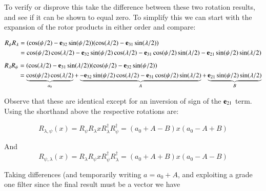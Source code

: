 \documentclass{article}      %
\begin{document}
To verify or disprove this take the difference between these two rotation results, and see if it can be shown to equal zero.  To simplify this we can start with the expansion of the rotor products in either order and compare:

\begin{align*}
R_{\psi} R_{\lambda} 
&= ( \cos(\psi/2) - \mathbf{e}_{32}\sin(\psi/2) )(\cos(\lambda/2) - \mathbf{e}_{31}\sin(\lambda/2)) \\
&= \cos(\psi/2)\cos(\lambda/2) - \mathbf{e}_{32}\sin(\psi/2)\cos(\lambda/2) - \mathbf{e}_{31} \cos(\psi/2) \sin(\lambda/2) - \mathbf{e}_{21} \sin(\psi/2) \sin(\lambda/2) \\
\end{align*}
\begin{align*}
R_{\lambda} R_{\psi}
&= (\cos(\lambda/2) - \mathbf{e}_{31}\sin(\lambda/2)) ( \cos(\psi/2) - \mathbf{e}_{32}\sin(\psi/2) ) \\
&= \underbrace{\cos(\psi/2)\cos(\lambda/2)}_{a_0} + \underbrace{-\mathbf{e}_{32}\sin(\psi/2)\cos(\lambda/2) - \mathbf{e}_{31} \cos(\psi/2) \sin(\lambda/2)}_{A} + \underbrace{\mathbf{e}_{21} \sin(\psi/2) \sin(\lambda/2)}_{B}
\end{align*}

Observe that these are identical except for an inversion of sign of the $\mathbf{e}_{21}$ term.  Using the shorthand above the respective rotations are:

\[
R_{\lambda,\psi}(x) = R_{\psi} R_{\lambda} x R_{\lambda}^\dagger R_{\psi}^\dagger = (a_0 + A - B) x (a_0 -A +B)
\]

And
\[
R_{\psi,\lambda}(x) = R_{\lambda} R_{\psi} x R_{\psi}^\dagger R_{\lambda}^\dagger = (a_0 + A + B) x (a_0 -A -B)
\]

Taking differences (and temporarily writing $a = a_0 + A$, and exploiting a grade one filter since the final result must be a vector we have
\end{document}
